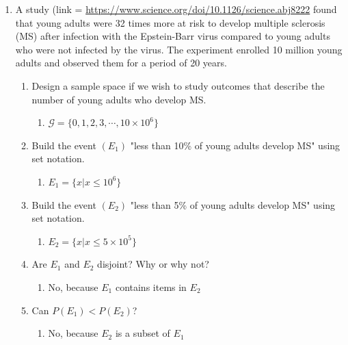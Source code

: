 \documentclass[krantz1,ChapterTOCs]{krantz}
\begin{document}
\begin{enumerate}
   \item A study (link = \href{here}{https://www.science.org/doi/10.1126/science.abj8222} found that young adults were 32 times more at risk to develop multiple sclerosis (MS) after infection with the Epstein-Barr virus compared to young adults who were not infected by the virus. The experiment enrolled 10 million young adults and observed them for a period of 20 years.
   \begin{enumerate}
       \item Design a sample space if we wish to study outcomes that describe the number of young adults who develop MS. 
           \begin{enumerate}
                \item {\color{red} $\mathcal{G} = \{ 0,1,2,3,\cdots,10 \times 10^{6} \}$  }
            \end{enumerate}
        
       \item Build the event $(E_{1})$ "less than 10\% of young adults develop MS" using set notation.
           \begin{enumerate}
                \item {\color{red} $E_{1} = \{ x | x \leq 10^{6}  \}$ }
            \end{enumerate}
        
       \item Build the event $(E_{2})$ "less than 5\% of young adults develop MS" using set notation.
           \begin{enumerate}
                \item {\color{red} $E_{2} = \{ x | x \leq 5\times 10^{5}  \}$}
            \end{enumerate}
        
       \item Are $E_{1}$ and $E_{2}$ disjoint? Why or why not?
           \begin{enumerate}
                \item {\color{red} No, because $E_{1}$ contains items in $E_{2}$}
            \end{enumerate}
        
       \item Can $P(E_{1}) < P(E_{2})$?
           \begin{enumerate}
                \item {\color{red} No, because $E_{2}$ is a subset of $E_{1}$ }
            \end{enumerate}
    \end{enumerate}
            

\end{enumerate}
\end{document}
